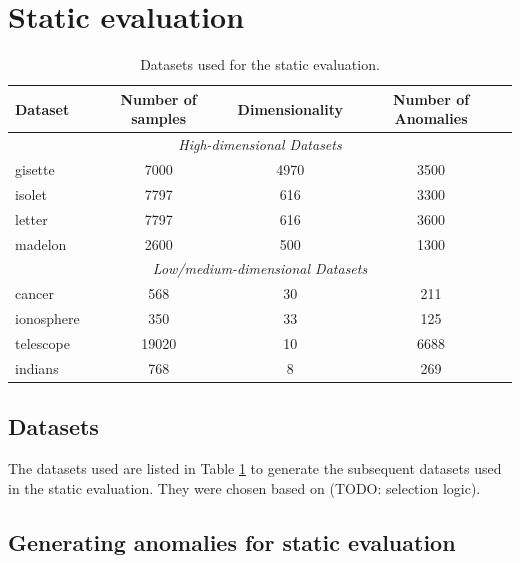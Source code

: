 
\section{Static evaluation}

\begin{table}[h!]
	\centering
	\begin{tabular}{lccc}
	\toprule
	\textbf{Dataset} & \textbf{Number of samples} & \textbf{Dimensionality} & \textbf{Number of Anomalies}\\
	\midrule
	\multicolumn{4}{c}{\textit{High-dimensional Datasets}}\\
	gisette 		& 7000 & 4970 & 3500	\\
	isolet 			& 7797 & 616 & 3300	\\
	letter			& 7797 & 616 & 3600	\\
	madelon 		& 2600 & 500 & 1300	\\
	\midrule
	\multicolumn{4}{c}{\textit{Low/medium-dimensional Datasets}}\\
	cancer 			& 568      & 30  & 211	\\
	ionosphere  & 350      & 33  & 125		\\
	telescope   & 19020    & 10  & 	6688		\\
	indians    	& 768      & 8	& 269		\\
	\bottomrule
	\end{tabular}
	\caption{Datasets used for the static evaluation.}
	\label{table:datasets}
\end{table}

\subsection{Datasets}

The datasets used are listed in Table \ref{table:datasets} to generate the subsequent datasets used in the static evaluation. They were chosen based on (TODO: selection logic).

\subsection{Generating anomalies for static evaluation}

